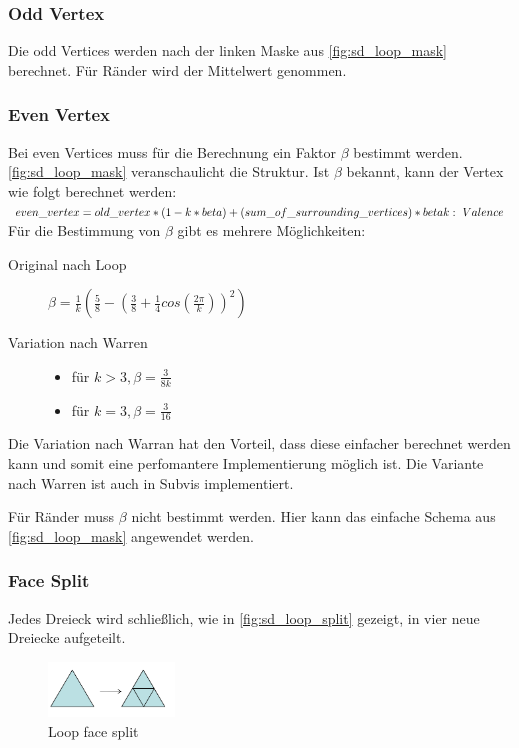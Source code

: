 \subsubsection*{Odd Vertex}
Die odd Vertices werden nach der linken Maske aus \autoref{fig:sd_loop_mask} berechnet.
Für Ränder wird der Mittelwert genommen.

\subsubsection*{Even Vertex}

Bei even Vertices muss für die Berechnung ein Faktor \(\beta\) bestimmt werden.
\autoref{fig:sd_loop_mask} veranschaulicht die Struktur.
Ist \(\beta\) bekannt, kann der Vertex wie folgt berechnet werden:\\
\(
even\_vertex = old\_vertex * (1 - k * beta) + (sum\_of\_surrounding\_vertices) * beta\\
k:\ Valence
\)
\\
Für die Bestimmung von \(\beta\) gibt es mehrere Möglichkeiten:
\begin{description}
\item[Original nach Loop]  \(\beta=\frac{1}{k}(\frac{5}{8}-(\frac{3}{8}+\frac{1}{4}cos(\frac{2\pi}{k}))^2)\)
\item[Variation nach Warren] \mbox{}
	\begin{itemize}
		\item für \(k > 3, \beta = \frac{3}{8k}\)
		\item für \(k = 3, \beta = \frac{3}{16}\)	
	\end{itemize}
\end{description}
Die Variation nach Warran hat den Vorteil, dass diese einfacher berechnet werden kann
und somit eine perfomantere Implementierung möglich ist.
Die Variante nach Warren ist auch in Subvis implementiert.
\cite{Carnegie}
\cite{Standford.Loop}
\cite[S. 70f]{Zorin.subdivcourse}

Für Ränder muss \(\beta\) nicht bestimmt werden.
Hier kann das einfache Schema aus \autoref{fig:sd_loop_mask} angewendet werden.

\subsubsection*{Face Split}

Jedes Dreieck wird schließlich, wie in \autoref{fig:sd_loop_split} gezeigt, in vier neue Dreiecke aufgeteilt.

\begin{figure}
\centering
\includegraphics[width=0.3\textwidth]{content/media/sd_loop_split.png}
\caption{Loop face split \cite[S. 56f]{Standford.24.07.2015}}
\label{fig:sd_loop_split}
\end{figure}

